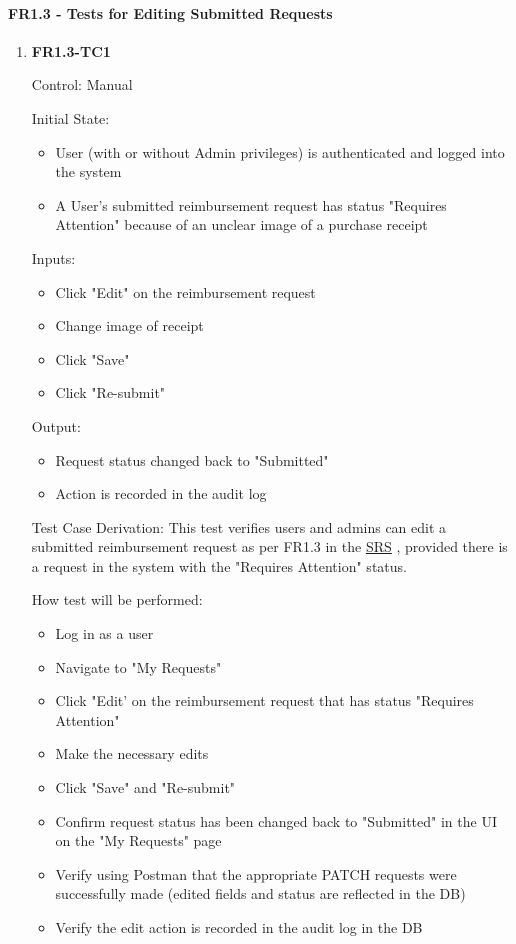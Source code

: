 \documentclass[12pt, titlepage]{article}
\begin{document}
\paragraph{FR1.3 - Tests for Editing Submitted Requests}

\begin{enumerate}
    \item{\textbf{FR1.3-TC1}}
    \hypertarget{FR1.3-TC1}{}
    
    Control: Manual
    
    Initial State:
    \begin{itemize}
        \item User (with or without Admin privileges) is authenticated and logged into the system
        \item A User's submitted reimbursement request has status "Requires Attention" because of an unclear image of a purchase receipt
    \end{itemize}
    
    Inputs: 
    \begin{itemize}
        \item Click "Edit" on the reimbursement request
        \item Change image of receipt
        \item Click "Save"
        \item Click "Re-submit"
    \end{itemize}
    
    Output: 
    \begin{itemize}
        \item Request status changed back to "Submitted"
        \item Action is recorded in the audit log
    \end{itemize}
    
    Test Case Derivation: This test verifies users and admins can edit a submitted reimbursement request as per FR1.3 in the \href{https://shorturl.at/FdAgR}{SRS} , provided there is a request in the system with the "Requires Attention" status.
    
    How test will be performed:
    \begin{itemize}
        \item Log in as a user
        \item Navigate to "My Requests"
        \item Click "Edit' on the reimbursement request that has status "Requires Attention" 
        \item Make the necessary edits
        \item Click "Save" and "Re-submit"
        \item Confirm request status has been changed back to "Submitted" in the UI on the "My Requests" page
        \item Verify using Postman that the appropriate PATCH requests were successfully made (edited fields and status are reflected in the DB)
        \item Verify the edit action is recorded in the audit log in the DB
    \end{itemize}
\end{enumerate}
\end{document}
